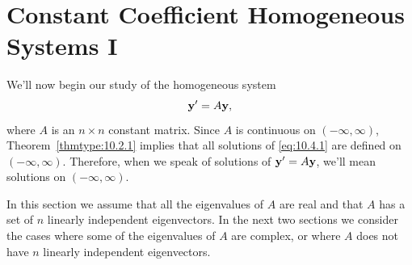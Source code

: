 \section{Constant Coefficient Homogeneous Systems I}

\noindent
We'll now begin our study of the homogeneous system
\begin{equation}
  \label{eq:10.4.1}{\bf y}'=A{\bf y},
\end{equation}
where $A$ is an $n\times n$ constant matrix. Since $A$ is continuous on $(-\infty,\infty)$,
Theorem~\ref{thmtype:10.2.1} implies that all solutions of \eqref{eq:10.4.1} are defined on
$(-\infty,\infty)$. Therefore, when we speak of solutions of ${\bf y}'=A{\bf y}$, we'll mean
solutions on $(-\infty,\infty)$.

In this section we assume that all the eigenvalues of $A$ are real and that $A$ has a set of $n$
linearly independent eigenvectors. In the next two sections we consider the cases where some of the
eigenvalues of $A$ are complex, or where $A$ does not have $n$ linearly independent eigenvectors.

